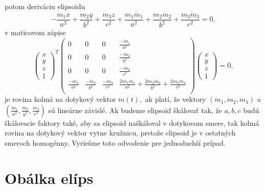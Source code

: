 potom deriváciu elipsoidu
$$
-\frac{\dot{m}_1x}{a^2} + \frac{\dot{m}_2y}{b^2} + \frac{\dot{m}_3z}{c^2} + \frac{m_1\dot{m}_1}{a^2} + \frac{m_2 \dot{m}_2}{b^2} + \frac{m_3 \dot{m}_3}{c^2} = 0,
$$
v maticovom zápise 
$$
\left(\begin{matrix} x \\ y \\ z  \\ 1
\end{matrix} \right)^T \left(\begin{matrix} 
0 & 0 & 0 & \frac{-\dot{m}_1}{a^2} \\
0 & 0 & 0 & \frac{-\dot{m}_2}{b^2} \\
0 & 0 & 0 & \frac{-\dot{m}_3}{c^2} \\
\frac{-\dot{m}_1}{a^2} & \frac{-\dot{m}_2}{b^2} & \frac{-\dot{m}_3}{c^2} & \frac{2m_1\dot{m}_1}{a^2} + \frac{2m_2 \dot{m}_2}{b^2} + \frac{2m_3 \dot{m}_3}{c^2}\\
\end{matrix} \right)\left(\begin{matrix} x \\ y \\ z \\ 1
\end{matrix} \right) = 0,
$$
je rovina kolmá na dotykový vektor $\dot{m}(t), $ ak platí, že vektory $(\dot{m}_1, \dot{m}_2, \dot{m}_3) $ a $(\frac{\dot{m}_1}{a^2}, \frac{\dot{m}_2}{b^2}, \frac{\dot{m}_3}{c^2}) $ sú lineárne závislé. Ak budeme elipsoid škálovať tak, že $a, b, c$ budú škálovacie faktory také, aby sa elipsoid naškáloval v dotykovom smere, tak kolmá rovina na dotykový vektor vytne kružnicu, pretože elipsoid je v ostatných smeroch homogénny. Vyriešme toto odvodenie pre jednoduchší prípad.

\section{Obálka elíps}
